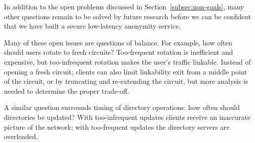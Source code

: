 \documentclass[times,10pt,twocolumn]{article}
\begin{document}
\label{sec:maintaining-anonymity}
 
In addition to the open problems discussed in
Section~\ref{subsec:non-goals}, many other questions remain to be
solved by future research before we can be confident that we
have built a secure low-latency anonymity service.

Many of these open issues are questions of balance.  For example,
how often should users rotate to fresh circuits?  Too-frequent
rotation is inefficient and expensive, but too-infrequent rotation
makes the user's traffic linkable.   Instead of opening a fresh
circuit; clients can also limit linkability exit from a middle point
of the circuit, or by truncating and re-extending the circuit, but
more analysis is needed to determine the proper trade-off.

A similar question surrounds timing of directory operations:
how often should directories be updated?  With too-infrequent
updates clients receive an inaccurate picture of the network; with
too-frequent updates the directory servers are overloaded.

%

\end{document}

